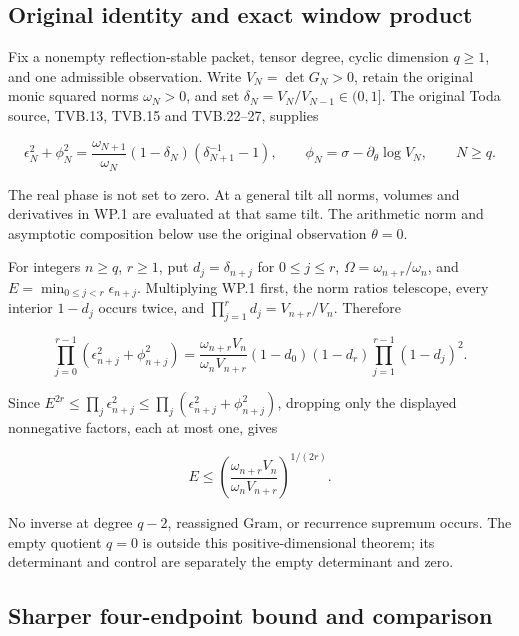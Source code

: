 \subsection[\hspace{0.4em}Original identity and exact window product]{Original identity and exact window product}\label{window-product-original-identity-and-exact-window-product}

Fix a nonempty reflection-stable packet, tensor degree, cyclic dimension \(q\ge1\), and one admissible observation. Write \(V_N=\det G_N>0\), retain the original monic squared norms \(\omega_N>0\), and set \(\delta_N=V_N/V_{N-1}\in(0,1]\). The original Toda source, TVB.13, TVB.15 and TVB.22--27, supplies

\[
\epsilon_N^2+\phi_N^2
=\frac{\omega_{N+1}}{\omega_N}(1-\delta_N)(\delta_{N+1}^{-1}-1),
\qquad \phi_N=\sigma-\partial_\theta\log V_N,\qquad N\ge q. \tag{WP.1}
\]

The real phase is not set to zero. At a general tilt all norms, volumes and derivatives in WP.1 are evaluated at that same tilt. The arithmetic norm and asymptotic composition below use the original observation \(\theta=0\).

For integers \(n\ge q\), \(r\ge1\), put \(d_j=\delta_{n+j}\) for \(0\le j\le r\), \(\Omega=\omega_{n+r}/\omega_n\), and \(E=\min_{0\le j<r}\epsilon_{n+j}\). Multiplying WP.1 first, the norm ratios telescope, every interior \(1-d_j\) occurs twice, and \(\prod_{j=1}^r d_j=V_{n+r}/V_n\). Therefore

\[
\boxed{\prod_{j=0}^{r-1}(\epsilon_{n+j}^2+\phi_{n+j}^2)
=\frac{\omega_{n+r}V_n}{\omega_nV_{n+r}}
(1-d_0)(1-d_r)\prod_{j=1}^{r-1}(1-d_j)^2.} \tag{WP.2}
\]

Since \(E^{2r}\le\prod_j\epsilon_{n+j}^2\le\prod_j(\epsilon_{n+j}^2+\phi_{n+j}^2)\), dropping only the displayed nonnegative factors, each at most one, gives

\[
\boxed{E\le\left(\frac{\omega_{n+r}V_n}{\omega_nV_{n+r}}\right)^{1/(2r)}.} \tag{WP.3}
\]

No inverse at degree \(q-2\), reassigned Gram, or recurrence supremum occurs. The empty quotient \(q=0\) is outside this positive-dimensional theorem; its determinant and control are separately the empty determinant and zero.

\subsection[\hspace{0.4em}Sharper four-endpoint bound and comparison]{Sharper four-endpoint bound and comparison}\label{window-product-sharper-four-endpoint-bound-and-comparison}

